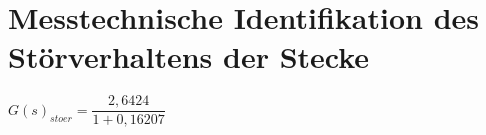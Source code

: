 
\newpage
[Perkowski]
\section{Messtechnische Identifikation des Störverhaltens der Stecke}

$ G(s)_{stoer} = \dfrac{2,6424}{1 + 0,16207} $